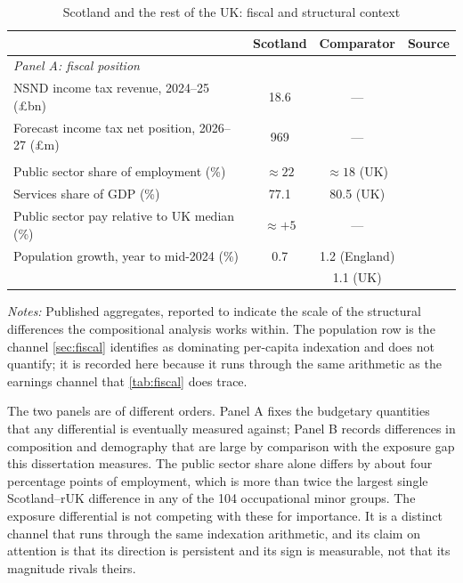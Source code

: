 \begin{table}[h]
\centering
\caption{Scotland and the rest of the UK: fiscal and structural context}
\label{tab:context}
\small
\begin{tabular}{lccl}
\toprule
 & Scotland & Comparator & Source \\
\midrule
\multicolumn{4}{l}{\textit{Panel A: fiscal position}} \\
NSND income tax revenue, 2024--25 (\pounds bn) & 18.6 & --- &
  \citet{hmrcoutturn2025} \\
Forecast income tax net position, 2026--27 (\pounds m) & 969 & --- &
  \citet{sfc2026} \\
\addlinespace
\multicolumn{4}{l}{\textit{Panel B: structural differences}} \\
Public sector share of employment (\%) & $\approx 22$ & $\approx 18$ (UK) &
  \citet{scotgov2024} \\
Services share of GDP (\%) & 77.1 & 80.5 (UK) &
  \citet{scotgov2024} \\
Public sector pay relative to UK median (\%) & $\approx +5$ & --- &
  \citet{cribb2025} \\
Population growth, year to mid-2024 (\%) & 0.7 & 1.2 (England) &
  \citet{park2023} \\
 &  & 1.1 (UK) &  \\
\bottomrule
\end{tabular}
\begin{minipage}{0.92\textwidth}
\vspace{0.4em}\footnotesize
\textit{Notes:} Published aggregates, reported to indicate the scale of the structural differences the compositional analysis works within. The population row is the channel \cref{sec:fiscal} identifies as dominating per-capita indexation and does not quantify; it is recorded here because it runs through the same arithmetic as the earnings channel that \cref{tab:fiscal} does trace.
\end{minipage}
\end{table}

The two panels are of different orders. Panel A fixes the budgetary quantities that any differential is eventually measured against; Panel B records differences in composition and demography that are large by comparison with the exposure gap this dissertation measures. The public sector share alone differs by about four percentage points of employment, which is more than twice the largest single Scotland--rUK difference in any of the 104 occupational minor groups. The exposure differential is not competing with these for importance. It is a distinct channel that runs through the same indexation arithmetic, and its claim on attention is that its direction is persistent and its sign is measurable, not that its magnitude rivals theirs.

